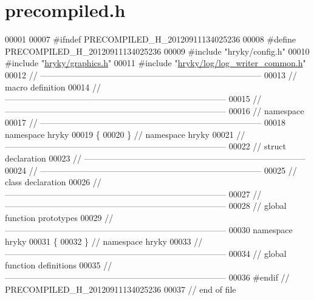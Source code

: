 \hypertarget{graphics_2src_2precompiled_8h_source}{\section{precompiled.\-h}
}

\begin{DoxyCode}
00001 
00007 \textcolor{preprocessor}{#ifndef PRECOMPILED\_H\_20120911134025236}
00008 \textcolor{preprocessor}{}\textcolor{preprocessor}{#define PRECOMPILED\_H\_20120911134025236}
00009 \textcolor{preprocessor}{}\textcolor{preprocessor}{#include "hryky/config.h"}
00010 \textcolor{preprocessor}{#include "\hyperlink{graphics_8h}{hryky/graphics.h}"}
00011 \textcolor{preprocessor}{#include "\hyperlink{log__writer__common_8h}{hryky/log/log_writer_common.h}"}
00012 \textcolor{comment}{//
      ------------------------------------------------------------------------------}
00013 \textcolor{comment}{// macro definition}
00014 \textcolor{comment}{//
      ------------------------------------------------------------------------------}
00015 \textcolor{comment}{//
      ------------------------------------------------------------------------------}
00016 \textcolor{comment}{// namespace}
00017 \textcolor{comment}{//
      ------------------------------------------------------------------------------}
00018 \textcolor{keyword}{namespace }hryky
00019 \{
00020 \} \textcolor{comment}{// namespace hryky}
00021 \textcolor{comment}{//
      ------------------------------------------------------------------------------}
00022 \textcolor{comment}{// struct declaration}
00023 \textcolor{comment}{//
      ------------------------------------------------------------------------------}
00024 \textcolor{comment}{//
      ------------------------------------------------------------------------------}
00025 \textcolor{comment}{// class declaration}
00026 \textcolor{comment}{//
      ------------------------------------------------------------------------------}
00027 \textcolor{comment}{//
      ------------------------------------------------------------------------------}
00028 \textcolor{comment}{// global function prototypes}
00029 \textcolor{comment}{//
      ------------------------------------------------------------------------------}
00030 \textcolor{keyword}{namespace }hryky
00031 \{
00032 \} \textcolor{comment}{// namespace hryky}
00033 \textcolor{comment}{//
      ------------------------------------------------------------------------------}
00034 \textcolor{comment}{// global function definitions}
00035 \textcolor{comment}{//
      ------------------------------------------------------------------------------}
00036 \textcolor{preprocessor}{#endif // PRECOMPILED\_H\_20120911134025236}
00037 \textcolor{preprocessor}{}\textcolor{comment}{// end of file}
\end{DoxyCode}
